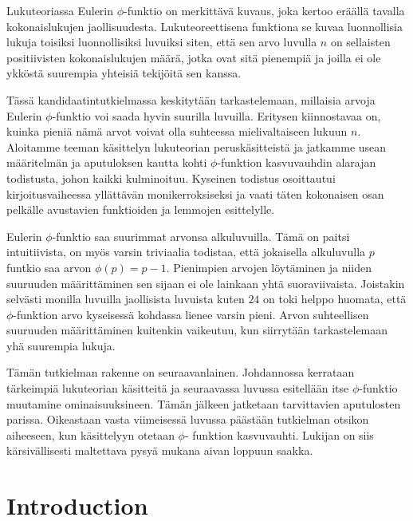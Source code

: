 \documentclass{article}
\begin{document}
\begin{otherlanguage}{finnish}

Lukuteoriassa Eulerin $\phi$-funktio on merkittävä kuvaus, joka kertoo eräällä taval\-la kokonaislukujen jaollisuudesta. Lukuteoreettisena funktiona se kuvaa luonnollisia lukuja toisiksi luonnollisiksi luvuiksi siten, että sen arvo luvulla $n$ on sellaisten positiivisten kokonaislukujen määrä, jotka ovat sitä pienempiä ja joilla ei ole ykköstä suurempia yhteisiä tekijöitä sen kanssa.

Tässä kandidaatintutkielmassa keskitytään tarkastelemaan, millaisia arvoja Eulerin $\phi$-funktio voi saada hyvin suurilla luvuilla. Eritysen kiinnostavaa on, kuinka pieniä nämä arvot voivat olla suhteessa mielivaltaiseen lukuun $n$. Aloitamme teeman käsittelyn lukuteorian peruskäsitteistä ja jatkamme usean määritelmän ja aputuloksen kautta kohti $\phi$-funktion kasvuvauhdin alarajan todistusta, johon kaikki kulminoituu. Kyseinen todistus osoittautui kirjoitusvaiheessa yllättävän monikerroksiseksi ja vaati täten kokonaisen osan pelkälle avustavien funktioiden ja lemmojen esittelylle.

Eulerin $\phi$-funktio saa suurimmat arvonsa alkuluvuilla. Tämä on paitsi intuitiivista, on myös varsin triviaalia todistaa, että jokaisella alkuluvulla $p$ funtkio saa arvon $\phi(p)=p-1$. Pienimpien arvojen löytäminen ja niiden suuruuden määrittäminen sen sijaan ei ole lainkaan yhtä suoraviivaista. Joistakin selvästi monilla luvuilla jaollisista luvuista kuten $24$ on toki helppo huomata, että $\phi$-funktion arvo kyseisessä kohdassa lienee varsin pieni. Arvon suhteellisen suuruuden määrittäminen kuitenkin vaikeutuu, kun siirrytään tarkastelemaan yhä suurempia lukuja.

Tämän tutkielman rakenne on seuraavanlainen. Johdannossa kerrataan tärkeimpiä lukuteorian käsitteitä ja seuraavassa luvussa esitellään itse $\phi$-funktio muutamine ominaisuuksineen. Tämän jälkeen jatketaan tarvittavien aputulosten parissa. Oikeastaan vasta viimeisessä luvussa päästään tutkielman otsikon aiheeseen, kun käsittelyyn otetaan $\phi$- funktion kasvuvauhti. Lukijan on siis kärsivällisesti maltettava pysyä mukana aivan loppuun saakka.

\end{otherlanguage}

\clearpage

\section{Introduction}
\end{document}
